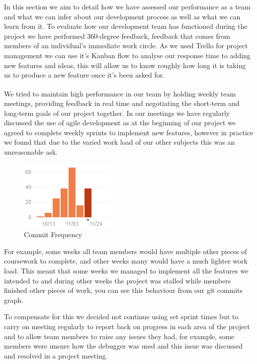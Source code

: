 \documentclass[10pt, a4paper]{article}
\begin{document}
In this section we aim to detail how we have assessed our performance as a team and what we can infer about our development process as well as what we can learn from it. To evaluate how our development team has functioned during the project we have performed 360-degree feedback, feedback that comes from members of an individual’s immediate work circle. As we used Trello for project management we can use it’s Kanban flow to analyse our response time to adding new features and ideas, this will allow us to know roughly how long it is taking us to produce a new feature once it’s been asked for.

We tried to maintain high performance in our team\textsuperscript{\cite{semantia}} by holding weekly team meetings, providing feedback in real time and negotiating the short-term and long-term goals of our project together. In our meetings we have regularly discussed the use of agile development as at the beginning of our project we agreed to complete weekly sprints to implement new features, however in practice we found that due to the varied work load of our other subjects this was an unreasonable ask. 

\begin{figure}
        \centering
        \includegraphics{images/evaluation/commit_freq.png}
        \caption{Commit Frequency}
\end{figure}

For example, some weeks all team members would have multiple other pieces of coursework to complete, and other weeks many would have a much lighter work load. This meant that some weeks we managed to implement all the features we intended to and during other weeks the project was stalled while members finished other pieces of work, you can see this behaviour from our git commits graph.


To compensate for this we decided not continue using set sprint times but to carry on meeting regularly to report back on progress in each area of the project and to allow team members to raise any issues they had, for example, some members were unsure how the debugger was used and this issue was discussed and resolved in a project meeting.
\end{document}

